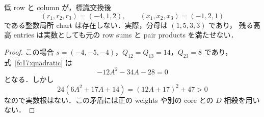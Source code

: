 \begin{corollary}[小さい三高分母データの実数障害]
\label{fc17:335}
低 row と column が，標識交換後
\[
 (r_1,r_2,r_3)=(-4,1,2),\qquad
 (x_1,x_2,x_3)=(-1,2,1)
\]
である整数局所 chart は存在しない．実際，分母は $(1,5,3,3)$ であり，
残る高高 entries は実数としても元の row sums と pair products を満たせない．
\end{corollary}

\begin{proof}
この場合 $s=(-4,-5,-4)$，$Q_{12}=Q_{13}=14$，$Q_{23}=8$ であり，
式~\eqref{fc17:quadratic} は
\[
 -12A^2-34A-28=0
\]
となる．しかし
\[
 24(6A^2+17A+14)=(12A+17)^2+47>0
\]
なので実数根はない．この矛盾には正の weights や別の core との $D$ 相殺を用いない．
\end{proof}
